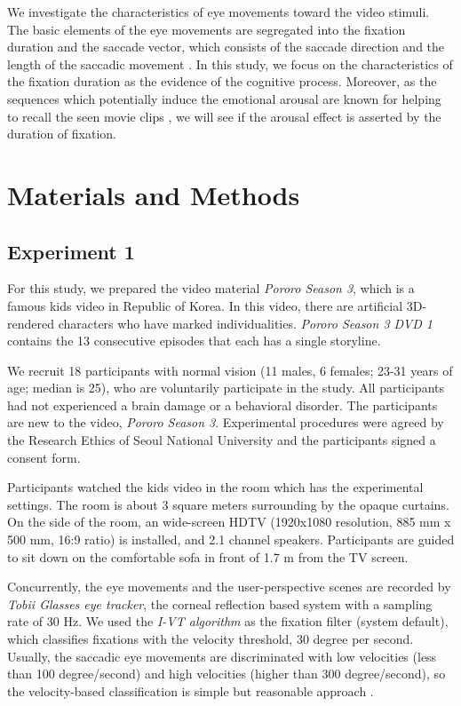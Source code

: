 \documentclass[10pt,letterpaper]{article}
\begin{document}
We investigate the characteristics of eye movements toward the video stimuli. The basic elements of the eye movements are segregated into the fixation duration and the saccade vector, which consists of the saccade direction and the length of the saccadic movement \cite{Findlay1999,Feng2006}. In this study, we focus on the characteristics of the fixation duration as the evidence of the cognitive process. Moreover, as the sequences which potentially induce the emotional arousal are known for helping to recall the seen movie clips \cite{Cahill1996amyg,Cahill1998baso}, we will see if the arousal effect is asserted by the duration of fixation.

\section{Materials and Methods}
\label{sec:material-and-methods}

\subsection{Experiment 1}

For this study, we prepared the video material \textit{Pororo Season 3}, which is a famous kids video in Republic of Korea. In this video, there are artificial 3D-rendered characters who have marked individualities. \textit{Pororo Season 3 DVD 1} contains the 13 consecutive episodes that each has a single storyline.

We recruit 18 participants with normal vision (11 males, 6 females; 23-31 years of age; median is 25), who are voluntarily participate in the study. All participants had not experienced a brain damage or a behavioral disorder. The participants are new to the video, \textit{Pororo Season 3}. Experimental procedures were agreed by the Research Ethics of Seoul National University and the participants signed a consent form.

Participants watched the kids video in the room which has the experimental settings. The room is about 3 square meters surrounding by the opaque curtains. On the side of the room, an wide-screen HDTV (1920x1080 resolution, 885 mm x 500 mm, 16:9 ratio) is installed, and 2.1 channel speakers. Participants are guided to sit down on the comfortable sofa in front of 1.7 m from the TV screen.

Concurrently, the eye movements and the user-perspective scenes are recorded by \textit{Tobii Glasses eye tracker}, the corneal reflection based system with a sampling rate of 30 Hz. We used the \textit{I-VT algorithm} as the fixation filter (system default), which classifies fixations with the velocity threshold, 30 degree per second. Usually, the saccadic eye movements are discriminated with low velocities (less than 100 degree/second) and high velocities (higher than 300 degree/second), so the velocity-based classification is simple but reasonable approach \cite{Salvucci2000}.
\end{document}
